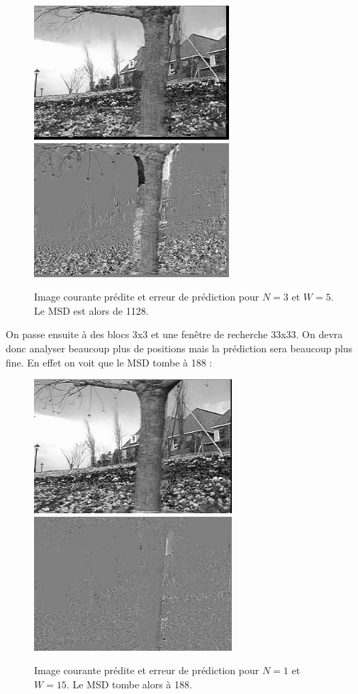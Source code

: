 \documentclass[a4paper, 12pt]{article}
\begin{document}
\begin{figure}[H]
	\centering
	\includegraphics[height=5cm]{../Resultats/Garden/garden_pred_n_3_w_5.jpg}
	\includegraphics[height=5cm]{../Resultats/Garden/garden_error_n_3_w_5.jpg}
	\caption{Image courante prédite et erreur de prédiction pour $N=3$ et $W=5$. Le MSD est alors de 1128.}
	\label{fig:garden_3_5}
\end{figure}

On passe ensuite à des blocs 3x3 et une fenêtre de recherche 33x33. On devra donc analyser beaucoup plus de positions mais la prédiction sera beaucoup plus fine. En effet on voit que le MSD tombe à 188 :

\begin{figure}[H]
	\centering
	\includegraphics[height=5cm]{../Resultats/Garden/garden_pred_n_1_w_15.jpg}
	\includegraphics[height=5cm]{../Resultats/Garden/garden_error_n_1_w_15.jpg}
	\caption{Image courante prédite et erreur de prédiction pour $N=1$ et $W=15$. Le MSD tombe alors à 188.}
	\label{fig:garden_1_15}
\end{figure}
\end{document}
